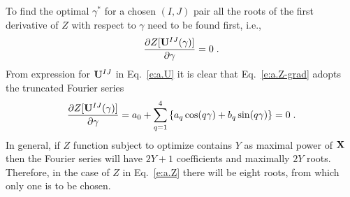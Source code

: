 \documentclass[aip,graphicx]{revtex4-1}
\begin{document}
To find the optimal $\gamma^*$ for a chosen $(I,J)$ pair
all the roots of the first derivative of $Z$ with respect to $\gamma$
need to be found first, i.e.,
%
\begin{equation} \label{e:a.Z-grad}
 \frac{\partial Z[{\bf U}^{IJ}(\gamma)]}{\partial \gamma} = 0 \;.
\end{equation}
%
From expression for ${\bf U}^{IJ}$ in Eq.~\eqref{e:a.U} it is clear that Eq.~\eqref{e:a.Z-grad}
adopts the truncated Fourier series
%
\begin{equation} \label{e:a.Z-grad-Fourier}
 \frac{\partial Z[{\bf U}^{IJ}(\gamma)]}{\partial \gamma} = 
  a_0 + \sum_{q=1}^4 \left\{ a_q\cos(q\gamma) + b_q\sin(q\gamma) \right\} = 0\;.
\end{equation}
%
In general, if $Z$ function subject to optimize contains $Y$ as maximal power of ${\bf X}$
then the Fourier series will have $2Y+1$ coefficients and maximally $2Y$ roots. Therefore,
in the case of $Z$ in Eq.~\eqref{e:a.Z} there will be eight roots, from which only one
is to be chosen.
\end{document}

